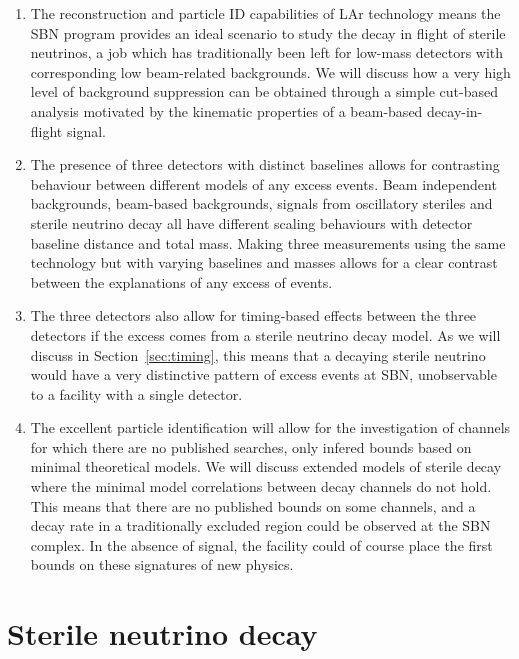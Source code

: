 \documentclass[11pt, a4paper]{article}
\newcommand{\refsec}[1]{Section~\ref{#1}}
\begin{document}
\begin{enumerate}

\item The reconstruction and particle ID capabilities of LAr technology means
the SBN program provides an ideal scenario to study the decay in flight of
sterile neutrinos, a job which has traditionally been left for low-mass
detectors with corresponding low beam-related backgrounds. 
%
We will discuss how a very high level of background suppression can be obtained
through a simple cut-based analysis motivated by the kinematic properties
of a beam-based decay-in-flight signal. 

\item The presence of three detectors with distinct baselines allows for 
contrasting behaviour between different models of any excess events. Beam 
independent backgrounds, beam-based backgrounds, signals from oscillatory 
steriles and sterile neutrino decay all have different scaling behaviours 
with detector baseline distance and total mass. Making three measurements using 
the same technology but with varying baselines and masses allows for a clear 
contrast between the explanations of any excess of events.

\item The three detectors also allow for timing-based effects between 
the three detectors if the excess comes from a sterile neutrino decay 
model. As we will discuss in \refsec{sec:timing}, this means that a decaying 
sterile neutrino would have a very distinctive pattern of excess events at
SBN, unobservable to a facility with a single detector.

\item The excellent particle identification will allow for the investigation of
channels for which there are no published searches, only infered bounds based
on minimal theoretical models. We will discuss extended models of sterile decay
where the minimal model correlations between decay channels do not hold. This
means that there are no published bounds on some channels, and a decay rate in
a traditionally excluded region could be observed at the SBN complex. In the
absence of signal, the facility could of course place the first bounds on these
signatures of new physics.

\end{enumerate} 


\section{Sterile neutrino decay}
\end{document}
